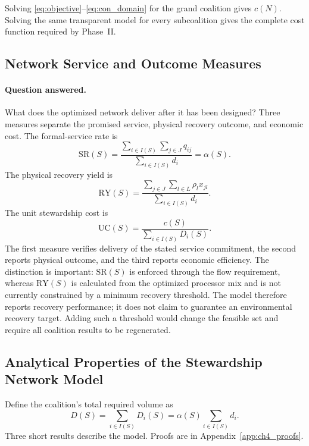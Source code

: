 Solving \eqref{eq:objective}--\eqref{eq:con_domain} for the grand coalition gives $c(N)$. Solving the same transparent model for every subcoalition gives the complete cost function required by Phase~II.

\subsection{Network Service and Outcome Measures}

\paragraph{Question answered.}
What does the optimized network deliver after it has been designed? Three measures separate the promised service, physical recovery outcome, and economic cost. The formal-service rate is
\begin{equation}
\label{eq:ch4_service_rate}
\mathrm{SR}(S)=
\frac{\sum_{i\in I(S)}\sum_{j\in J}q_{ij}}
{\sum_{i\in I(S)}d_i}
=\alpha(S).
\end{equation}
The physical recovery yield is
\begin{equation}
\label{eq:ch4_recovery_yield}
\mathrm{RY}(S)=
\frac{\sum_{j\in J}\sum_{l\in L}\rho_l x_{jl}}
{\sum_{i\in I(S)}d_i}.
\end{equation}
The unit stewardship cost is
\begin{equation}
\label{eq:ch4_unit_cost}
\mathrm{UC}(S)=
\frac{c(S)}{\sum_{i\in I(S)}D_i(S)}.
\end{equation}
The first measure verifies delivery of the stated service commitment, the second reports physical outcome, and the third reports economic efficiency. The distinction is important: $\mathrm{SR}(S)$ is enforced through the flow requirement, whereas $\mathrm{RY}(S)$ is calculated from the optimized processor mix and is not currently constrained by a minimum recovery threshold. The model therefore reports recovery performance; it does not claim to guarantee an environmental recovery target. Adding such a threshold would change the feasible set and require all coalition results to be regenerated.

\subsection{Analytical Properties of the Stewardship Network Model}

Define the coalition's total required volume as
\begin{equation}
\label{eq:ch4_formal_demand}
 D(S)=\sum_{i\in I(S)}D_i(S)
 =\alpha(S)\sum_{i\in I(S)}d_i.
\end{equation}
Three short results describe the model. Proofs are in Appendix~\ref{app:ch4_proofs}.

